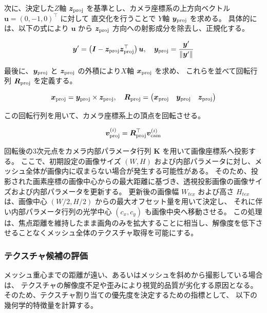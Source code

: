 次に、決定した$Z$軸 $\bm{z}_{\rm proj}$ を基準とし、カメラ座標系の上方向ベクトル $\bm{u} = (0, -1, 0)^\top$ に対して
直交化を行うことで $Y$軸 $\bm{y}_{\rm proj}$ を求める。
具体的には、以下の式により $\bm{u}$ から $\bm{z}_{\rm proj}$ 方向への射影成分を除去し、正規化する。

\begin{equation}
  \bm{y}' = \left( \bm{I} - \bm{z}_{\rm proj}\bm{z}_{\rm proj}^\top \right) \bm{u}, \quad \bm{y}_{\rm proj} = \frac{\bm{y}'}{\|\bm{y}'\|}
\end{equation}

最後に、$\bm{y}_{\rm proj}$ と $\bm{z}_{\rm proj}$ の外積により$X$軸 $\bm{x}_{\rm proj}$ を求め、
これらを並べて回転行列 $\bm{R}_{\rm proj}$ を定義する。

\begin{equation}
  \bm{x}_{\rm proj} = \bm{y}_{\rm proj} \times \bm{z}_{\rm proj}, \quad
  \bm{R}_{\rm proj} = 
  \begin{pmatrix} 
    \bm{x}_{\rm proj} & \bm{y}_{\rm proj} & \bm{z}_{\rm proj} 
  \end{pmatrix}
\end{equation}

この回転行列を用いて、カメラ座標系上の頂点を回転させる。

\begin{equation}
  \bm{v}_{\rm proj}^{(i)} = \bm{R}_{\rm proj}^{\top} \bm{v}_{\rm cam}^{(i)}
\end{equation}

回転後の3次元点をカメラ内部パラメータ行列 $\bm{K}$ を用いて画像座標系へ投影する。
ここで、初期設定の画像サイズ $(W, H)$ および内部パラメータに対し、メッシュ全体が画像内に収まらない場合が発生する可能性がある。
そのため、投影された画素座標の画像中心からの最大距離に基づき、透視投影画像の画像サイズおよび内部パラメータを更新する。
更新後の画像幅 $W_{tex}$ および高さ $H_{tex}$ は、画像中心 $(W/2, H/2)$ からの最大オフセット量を用いて決定し、
それに伴い内部パラメータ行列の光学中心 $(c_x, c_y)$ も画像中央へ移動させる。
この処理は、焦点距離を維持したまま画角のみを拡大することに相当し、解像度を低下させることなくメッシュ全体のテクスチャ取得を可能にする。


\subsubsection*{テクスチャ候補の評価}

メッシュ重心までの距離が遠い、あるいはメッシュを斜めから撮影している場合は、
テクスチャの解像度不足や歪みにより視覚的品質が劣化する原因となる。
そのため、テクスチャ割り当ての優先度を決定するための指標として、
以下の幾何学的特徴量を計算する。

